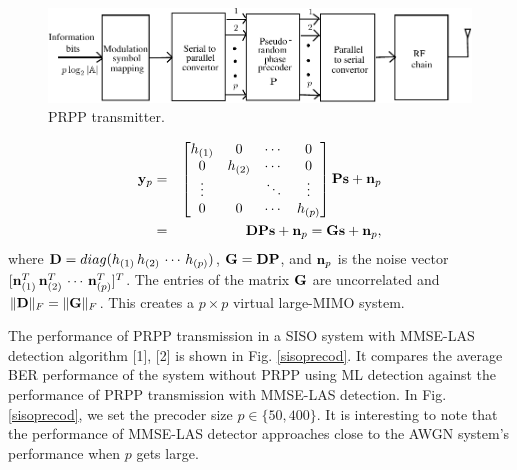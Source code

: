 \documentclass[11pt, onecolumn]{report}
\newcommand{\vy}{{\bf y}}
\newcommand{\vn}{{\bf n}}
\newcommand{\pp}{{\bf P}}
\newcommand{\mg}{{\bf G}}
\newcommand{\md}{{\bf D}}
\begin{document}
\begin{figure}[htb]
\centering
\includegraphics[scale=1]{sisoprecod.pdf}
\caption{PRPP transmitter.}
\label{prppblock}
\end{figure}

\begin{eqnarray}
\vy_p&=& 
 \begin{bmatrix} 
   h_{(1)} & { 0} & \cdots & { 0} \\
   { 0}   & h_{(2)} & \cdots & { 0} \\
   \vdots & & \ddots & \vdots \\
   { 0} & { 0} & \cdots & h_{(p)}
 \end{bmatrix}\pp\mathbf s+\vn_p \nonumber\\
 &=&\md\pp\mathbf s + \vn_p=\mg\mathbf s + \vn_p,
\end{eqnarray}
where $\md=diag(h_{(1)}\, h_{(2)}\, \cdots\, h_{(p)})$, 
$\mg=\md\pp$, and $\vn_p$ is the noise vector 
$[\vn_{(1)}^T\, \vn_{(2)}^T\, \cdots\, \vn_{(p)}^T]^T$. The entries of the matrix $\mg$ are uncorrelated and 
$\lVert \md\rVert_F=\lVert \mg \rVert_F$. This creates a $p\times p$ 
virtual large-MIMO system.

The performance of PRPP transmission in a SISO system with MMSE-LAS detection algorithm [1], [2] is shown in Fig. \ref{sisoprecod}. It compares the average BER performance of the system without PRPP using ML detection against the performance of  PRPP transmission with MMSE-LAS detection. In Fig. \ref{sisoprecod}, we set the precoder size $p\in\{50,400\}$. It is interesting to note that the performance of MMSE-LAS detector approaches close to the AWGN system's performance when $p$ gets large.
\end{document}
